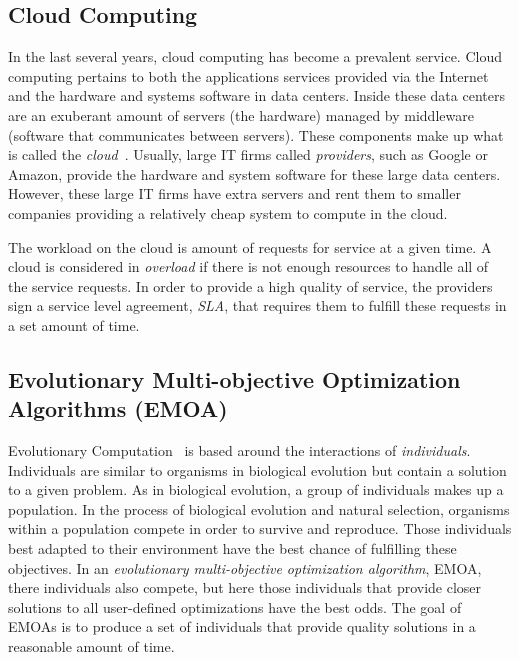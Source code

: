 \documentclass{sig-alternate}
\begin{document}
\subsection{Cloud Computing}
\label{sec:Cloud Computing}

In the last several years, cloud computing has become a prevalent service. Cloud computing pertains to both the applications services provided via the Internet and the hardware and systems software in data centers. Inside these data centers are an exuberant amount of servers (the hardware) managed by middleware (software that communicates between servers). These components make up what is called the \emph{cloud}~\cite{Armbrust}. Usually, large IT firms called \emph{providers}, such as Google or Amazon, provide the hardware and system software for these large data centers. However, these large IT firms have extra servers and rent them to smaller companies providing a relatively cheap system to compute in the cloud. 

The workload on the cloud is amount of requests for service at a given time. A cloud is considered in \emph{overload} if there is not enough resources to handle all of the service requests. In order to provide a high quality of service, the providers sign a service level agreement, \emph{SLA}, that requires them to fulfill these requests in a set amount of time. 

\subsection{Evolutionary Multi-objective Optimization Algorithms (EMOA)}
\label{sec:EMOA}

Evolutionary Computation~\cite{poli08:fieldguide} is based around the interactions of \emph{individuals}. Individuals are similar to organisms in biological evolution but contain a solution to a given problem. As in biological evolution, a group of individuals makes up a population. In the process of biological evolution and natural selection, organisms within a population compete in order to survive and reproduce. Those individuals best adapted to their environment have the best chance of fulfilling these objectives.  In an \emph{evolutionary multi-objective optimization algorithm}, EMOA, there individuals also compete, but here those individuals that provide closer solutions to all user-defined optimizations have the best odds. The goal of EMOAs is to produce a set of individuals that provide quality solutions in a reasonable amount of time. 
\end{document}
